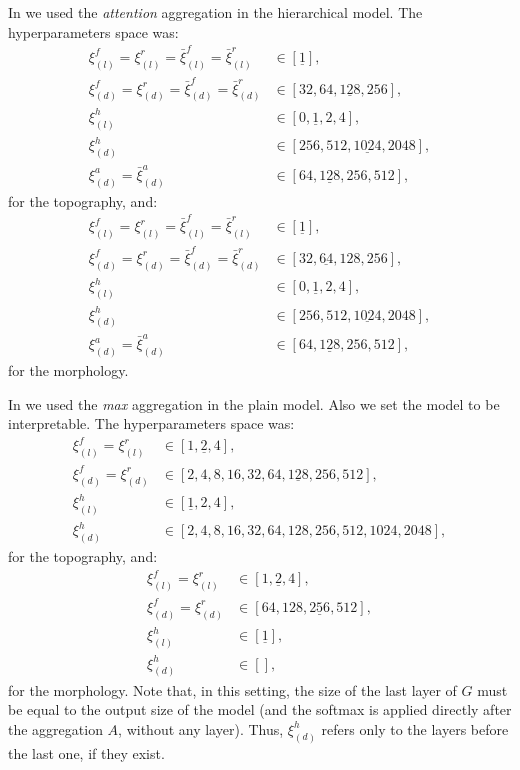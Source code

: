 In \softmaxh{} we used the \emph{attention} aggregation in the
hierarchical model. The hyperparameters space was:
\begin{align*}
  \xi_{(l)}^f=\xi_{(l)}^r=\bar{\xi}^f_{(l)}=\bar{\xi}^r_{(l)}&\in[\underline{1}],\\
  \xi_{(d)}^f=\xi_{(d)}^r=\bar{\xi}^f_{(d)}=\bar{\xi}^r_{(d)}&\in[32,64,\underline{128},256],\\
  \xi_{(l)}^h&\in[0,\underline{1},2,4],\\
  \xi_{(d)}^h&\in[256,512,\underline{1024},2048],\\
  \xi_{(d)}^a=\bar{\xi}^a_{(d)}&\in[64,\underline{128},256,512],
\end{align*}
for the topography, and:
\begin{align*}
  \xi_{(l)}^f=\xi_{(l)}^r=\bar{\xi}^f_{(l)}=\bar{\xi}^r_{(l)}&\in[\underline{1}],\\
  \xi_{(d)}^f=\xi_{(d)}^r=\bar{\xi}^f_{(d)}=\bar{\xi}^r_{(d)}&\in[32,\underline{64},128,256],\\
  \xi_{(l)}^h&\in[0,\underline{1},2,4],\\
  \xi_{(d)}^h&\in[256,512,\underline{1024},2048],\\
  \xi_{(d)}^a=\bar{\xi}^a_{(d)}&\in[64,\underline{128},256,512],
\end{align*}
for the morphology.

In \maxi{} we used the \emph{max} aggregation in the plain
model. Also we set the model to be interpretable. The hyperparameters
space was: 
\begin{align*}
  \xi_{(l)}^f=\xi_{(l)}^r&\in[1,\underline{2},4],\\
  \xi_{(d)}^f=\xi_{(d)}^r&\in[2,4,8,16,32,64,\underline{128},256,512],\\
  \xi_{(l)}^h&\in[\underline{1},2,4],\\
  \xi_{(d)}^h&\in[2,4,8,16,32,64,128,256,512,1024,2048],
\end{align*}
for the topography, and:
\begin{align*}
  \xi_{(l)}^f=\xi_{(l)}^r&\in[1,\underline{2},4],\\
  \xi_{(d)}^f=\xi_{(d)}^r&\in[64,128,\underline{256},512],\\
  \xi_{(l)}^h&\in[\underline{1}],\\
  \xi_{(d)}^h&\in[],
\end{align*}
for the morphology. Note that, in this setting, the size of the
last layer of $G$ must be equal to the output size of the model
(and the softmax is applied directly after the aggregation $A$,
without any layer). Thus, $\xi_{(d)}^h$ refers only to the
layers before the last one, if they exist.

